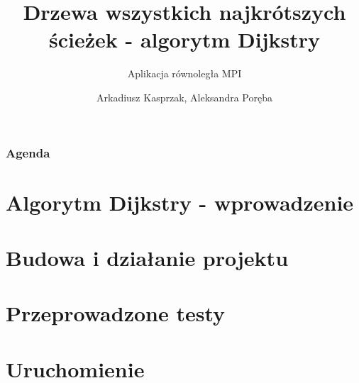 \documentclass[10pt]{beamer}
\title{Drzewa wszystkich najkrótszych ścieżek - algorytm Dijkstry}
\subtitle{\normalsize{Aplikacja równoległa MPI}}
\date{}
\author{\normalsize{Arkadiusz Kasprzak, Aleksandra Poręba}}
\begin{document}
\titleframe[pl]

\begin{frame}
\frametitle{Agenda}
\tableofcontents
\end{frame}

\section{Algorytm Dijkstry - wprowadzenie}

\begin{frame}

\end{frame}

\section{Budowa i działanie projektu}

\begin{frame}

\end{frame}

\section{Przeprowadzone testy}

\begin{frame}

\end{frame}

\section{Uruchomienie}

\begin{frame}

\end{frame}
\end{document}
